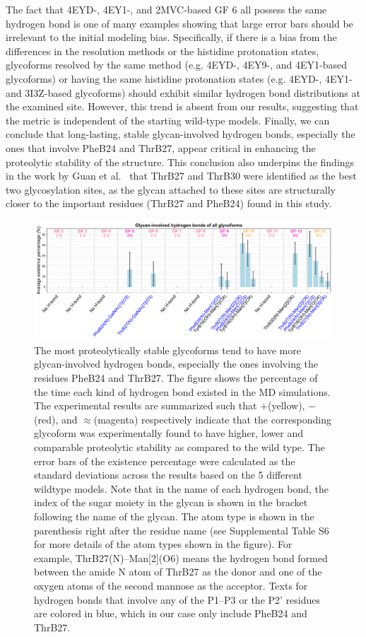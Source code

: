 \documentclass[sn-vancouver]{sn-jnl}
\begin{document}
The fact that 4EYD-, 4EY1-, and 2MVC-based GF 6 all possess the same hydrogen bond is one of many examples showing that large error bars should be irrelevant to the initial modeling bias. Specifically, if there is a bias from the differences in the resolution methods or the histidine protonation states, glycoforms resolved by the same method (e.g. 4EYD-, 4EY9-, and 4EY1-based glycoforms) or having the same histidine protonation states (e.g. 4EYD-, 4EY1- and 3I3Z-based glycoforms) should exhibit similar hydrogen bond distributions at the examined site. However, this trend is absent from our results, suggesting that the metric is independent of the starting wild-type models. Finally, we can conclude that long-lasting, stable glycan-involved hydrogen bonds, especially the ones that involve PheB24 and ThrB27, appear critical in enhancing the proteolytic stability of the structure. This conclusion also underpins the findings in the work by Guan et al.~\cite{guan2018chemically} that ThrB27 and ThrB30 were identified as the best two glycosylation sites, as the glycan attached to these sites are structurally closer to the important residues (ThrB27 and PheB24) found in this study. 
\begin{figure}[H]
\centering
\includegraphics[width=\textwidth]{Figures/hbond_results.png}
\caption{The most proteolytically stable glycoforms tend to have more glycan-involved hydrogen bonds, especially the ones involving the residues PheB24 and ThrB27. The figure shows the percentage of the time each kind of hydrogen bond existed in the MD simulations. The experimental results are summarized such that $+$(yellow), $-$(red), and $\approx$(magenta) respectively indicate that the corresponding glycoform was experimentally found to have higher, lower and comparable proteolytic stability as compared to the wild type. The error bars of the existence percentage were calculated as the standard deviations across the results based on the 5 different wildtype models. Note that in the name of each hydrogen bond, the index of the sugar moiety in the glycan is shown in the bracket following the name of the glycan. The atom type is shown in the parenthesis right after the residue name (see Supplemental Table S6 for more details of the atom types shown in the figure). For example, ThrB27(N)--Man[2](O6) means the hydrogen bond formed between the amide N atom of ThrB27 as the donor and one of the oxygen atoms of the second mannose as the acceptor. Texts for hydrogen bonds that involve any of the P1--P3 or the P2' residues are colored in blue, which in our case only include PheB24 and ThrB27.}
\label{result_hbond}
\end{figure}
\end{document}
